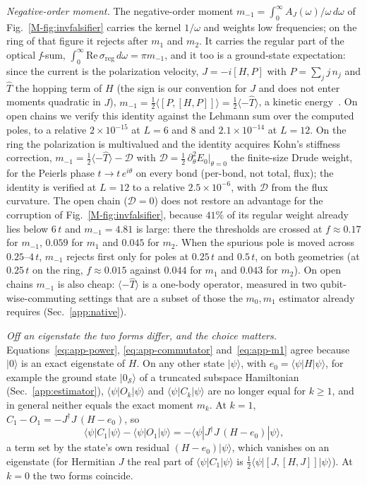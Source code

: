 \documentclass[aps,prb,onecolumn,superscriptaddress,longbibliography,floatfix]{revtex4-2}
\begin{document}
\emph{Negative-order moment.} The negative-order moment ${m_{-1}=\int_0^\infty A_J(\omega)/\omega\,d\omega}$ of Fig.~\ref{M-fig:invfalsifier} carries the kernel $1/\omega$ and weights low frequencies; on the ring of that figure it rejects after $m_1$ and $m_2$. It carries the regular part of the optical \textit{f}-sum, $\int_0^\infty\!\mathrm{Re}\,\sigma_{\mathrm{reg}}\,d\omega=\pi m_{-1}$, and it too is a ground-state expectation: since the current is the polarization velocity, $J=-i[H,P]$ with $P=\sum_j j\,n_j$ and $\hat T$ the hopping term of $H$ (the sign is our convention for $J$ and does not enter moments quadratic in $J$), $m_{-1}=\tfrac12\langle[P,[H,P]]\rangle=\tfrac{1}{2}\langle-\hat T\rangle$, a kinetic energy~\cite{Kohn1964,Maldague1977,HohenbergMartin1965}. On open chains we verify this identity against the Lehmann sum over the computed poles, to a relative $2\times10^{-15}$ at $L=6$ and $8$ and $2.1\times10^{-14}$ at $L=12$. On the ring the polarization is multivalued and the identity acquires Kohn's stiffness correction, $m_{-1}=\tfrac12\langle-\hat T\rangle-\mathcal D$ with $\mathcal D=\tfrac12\,\partial^2_\theta E_0|_{\theta=0}$ the finite-size Drude weight, for the Peierls phase $t\to t\,e^{i\theta}$ on every bond (per-bond, not total, flux); the identity is verified at $L=12$ to a relative $2.5\times10^{-6}$, with $\mathcal D$ from the flux curvature. The open chain ($\mathcal D=0$) does not restore an advantage for the corruption of Fig.~\ref{M-fig:invfalsifier}, because $41\%$ of its regular weight already lies below $6\,t$ and $m_{-1}=4.81$ is large: there the thresholds are crossed at $f\approx0.17$ for $m_{-1}$, $0.059$ for $m_1$ and $0.045$ for $m_2$. When the spurious pole is moved across $0.25$--$4\,t$, $m_{-1}$ rejects first only for poles at $0.25\,t$ and $0.5\,t$, on both geometries (at $0.25\,t$ on the ring, $f\approx0.015$ against $0.044$ for $m_1$ and $0.043$ for $m_2$). On open chains $m_{-1}$ is also cheap: $\langle-\hat T\rangle$ is a one-body operator, measured in two qubit-wise-commuting settings that are a subset of those the $m_0,m_1$ estimator already requires (Sec.~\ref{app:native}).

\emph{Off an eigenstate the two forms differ, and the choice matters.} Equations~\eqref{eq:app-power}, \eqref{eq:app-commutator} and~\eqref{eq:app-m1} agree because $|0\rangle$ is an exact eigenstate of $H$. On any other state $|\psi\rangle$, with ${e_0=\langle\psi|H|\psi\rangle}$, for example the ground state $|0_\mathcal{S}\rangle$ of a truncated subspace Hamiltonian (Sec.~\ref{app:estimator}), $\langle\psi|O_k|\psi\rangle$ and $\langle\psi|C_k|\psi\rangle$ are no longer equal for $k\ge1$, and in general neither equals the exact moment $m_k$. At $k=1$, $C_1-O_1=-J^\dagger J\,(H-e_0)$, so
\[
\langle\psi|C_1|\psi\rangle-\langle\psi|O_1|\psi\rangle=-\langle\psi|J^\dagger J\,(H-e_0)|\psi\rangle ,
\]
a term set by the state's own residual $(H-e_0)|\psi\rangle$, which vanishes on an eigenstate (for Hermitian $J$ the real part of $\langle\psi|C_1|\psi\rangle$ is $\tfrac12\langle\psi|[J,[H,J]]|\psi\rangle$). At $k=0$ the two forms coincide.
\end{document}
